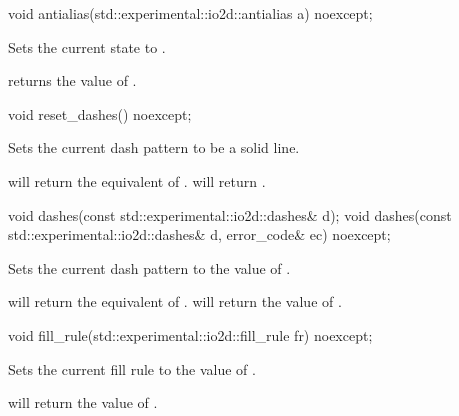 \begin{itemdecl}
void antialias(std::experimental::io2d::antialias a) noexcept;
\end{itemdecl}
\begin{itemdescr}
	\pnum
	\effects
	Sets the current  state to .
	
	\pnum
	\postconditions
	 returns the value of .
\end{itemdescr}

\begin{itemdecl}
void reset_dashes() noexcept;
\end{itemdecl}
\begin{itemdescr}
	\pnum
	\effects
	Sets the current dash pattern to be a solid line.
	
	\pnum
	\postconditions
	 will return the equivalent of .  will return .
\end{itemdescr}

\begin{itemdecl}
void dashes(const std::experimental::io2d::dashes& d);
void dashes(const std::experimental::io2d::dashes& d, error_code& ec) noexcept;
\end{itemdecl}
\begin{itemdescr}
	\pnum
	\effects
	Sets the current dash pattern to the value of .
	
	\pnum
	\postconditions
	 will return the equivalent of .  will return the value of .
\end{itemdescr}

\begin{itemdecl}
void fill_rule(std::experimental::io2d::fill_rule fr) noexcept;
\end{itemdecl}
\begin{itemdescr}
	\pnum
	\effects
	Sets the current fill rule to the value of .
	
	\pnum
	\postconditions
	 will return the value of .
\end{itemdescr}


